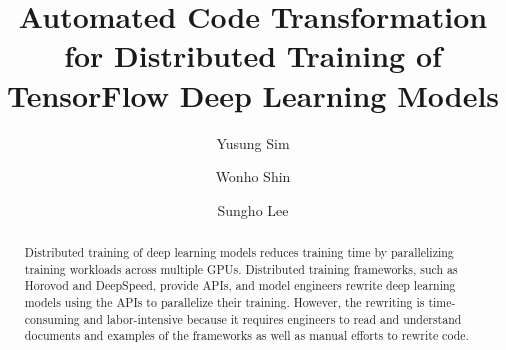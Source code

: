 \documentclass[preprint, 12pt]{elsarticle}%
\begin{document}
\begin{frontmatter}

\title{Automated Code Transformation for Distributed Training of TensorFlow Deep Learning Models}

\author[inst1]{Yusung Sim}

\author[inst1]{Wonho Shin}

\author[inst2]{Sungho Lee}









\begin{abstract}
Distributed training of deep learning models reduces training time by
parallelizing training workloads across multiple GPUs.
Distributed training frameworks, such as Horovod and DeepSpeed, provide APIs,
and model engineers rewrite deep learning models using the APIs to parallelize
their training.
However, the rewriting is time-consuming and labor-intensive because it
requires engineers to read and understand documents and examples of the
frameworks as well as manual efforts to rewrite code.


\end{abstract}
\end{frontmatter}
\end{document}
